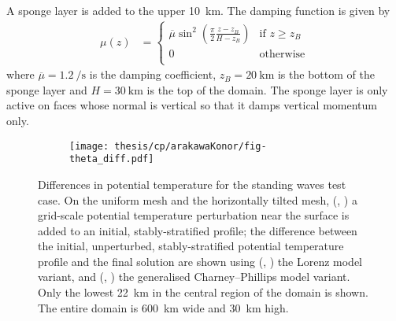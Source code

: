 A sponge layer is added to the upper \SI{10}{\kilo\meter}.  The damping function is given by
\begin{align}
	\mu(z) &= \begin{cases}
		\overline{\mu} \sin^2 \left( \frac{\pi}{2} \frac{z - z_B}{H - z_B} \right) & \text{if } z \geq z_B \\
		0 & \text{otherwise} \\
	\end{cases}
\end{align}
where $\overline{\mu} = \SI{1.2}{\per\second}$ is the damping coefficient, $z_B = \SI{20}{\kilo\meter}$ is the bottom of the sponge layer and $H = \SI{30}{\kilo\meter}$ is the top of the domain.
The sponge layer is only active on faces whose normal is vertical so that it damps vertical momentum only.


\begin{figure}
	\centering
	\begin{subfigure}{\textwidth}
		\label{fig:cp:arakawaKonor:theta_diff:uniform:initial}
		\label{fig:cp:arakawaKonor:theta_diff:uniform:lorenz}
		\label{fig:cp:arakawaKonor:theta_diff:uniform:cp}
		\label{fig:cp:arakawaKonor:theta_diff:hEdgeGrading:initial}
		\label{fig:cp:arakawaKonor:theta_diff:hEdgeGrading:lorenz}
		\label{fig:cp:arakawaKonor:theta_diff:hEdgeGrading:cp}
		\texttt{[image: thesis/cp/arakawaKonor/fig-theta\_diff.pdf]}
	\end{subfigure}
%
	\caption{
	Differences in potential temperature for the standing waves test case.
	On the uniform mesh and the horizontally tilted mesh,
	(,
	)
	a grid-scale potential temperature perturbation near the surface is added to an initial, stably-stratified profile;
the difference between the initial, unperturbed, stably-stratified potential temperature profile and the final solution are shown using
	(,
	)
	the Lorenz model variant, and 
	(,
	)
	the generalised Charney--Phillips model variant.
Only the lowest \SI{22}{\kilo\meter} in the central region of the domain is shown.  The entire domain is \SI{600}{\kilo\meter} wide and \SI{30}{\kilo\meter} high.
	}
	\label{fig:cp:arakawaKonor:theta_diff}
\end{figure}

